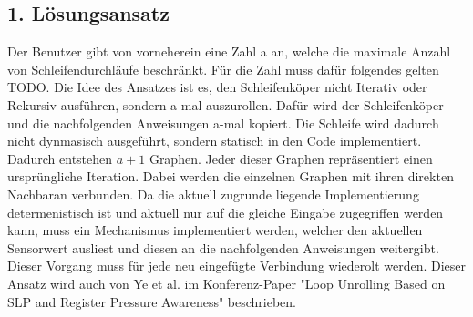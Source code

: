 \documentclass{article}
\begin{document}
    \subsection{1. Lösungsansatz}
    Der Benutzer gibt von vorneherein eine Zahl a an, welche die maximale Anzahl von Schleifendurchläufe beschränkt. Für die Zahl muss dafür folgendes gelten TODO.
    Die Idee des Ansatzes ist es, den Schleifenköper nicht Iterativ oder Rekursiv ausführen, sondern a-mal auszurollen.
    Dafür wird der Schleifenköper und die nachfolgenden Anweisungen a-mal kopiert. Die Schleife wird dadurch nicht dynmasisch ausgeführt, sondern statisch in den Code implementiert. Dadurch entstehen $a+1$ Graphen. Jeder dieser Graphen repräsentiert einen ursprüngliche Iteration. Dabei werden die einzelnen Graphen mit ihren direkten Nachbaran verbunden. 
    Da die aktuell zugrunde liegende Implementierung determenistisch ist und aktuell nur auf die gleiche Eingabe zugegriffen werden kann, muss ein Mechanismus implementiert werden, welcher den aktuellen Sensorwert ausliest und diesen an die nachfolgenden Anweisungen weitergibt. Dieser Vorgang muss für jede neu eingefügte Verbindung wiederolt werden.
    Dieser Ansatz wird auch von Ye et al. im Konferenz-Paper "Loop Unrolling Based on SLP and Register Pressure Awareness" beschrieben.\\
\end{document}
